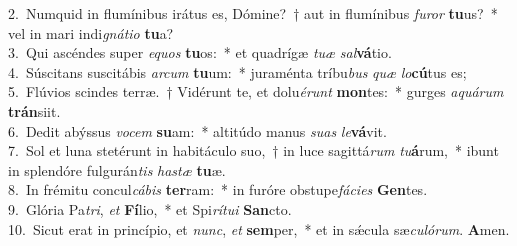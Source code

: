{2.~}Numquid in flumínibus irátus es, Dómine?~† aut in flumínibus \textit{fu}\textit{ror} \textbf{tu}us?~* vel in mari indi\textit{gná}\textit{ti}\textit{o} \textbf{tu}a?\\
{3.~}Qui ascéndes super \textit{e}\textit{quos} \textbf{tu}os:~* et quadrígæ \textit{tu}\textit{æ} \textit{sal}\textbf{vá}tio.\\
{4.~}Súscitans suscitábis \textit{ar}\textit{cum} \textbf{tu}um:~* juraménta tríbu\textit{bus} \textit{quæ} \textit{lo}\textbf{cú}tus es;\\
{5.~}Flúvios scindes terræ.~† Vidérunt te, et dolu\textit{é}\textit{runt} \textbf{mon}tes:~* gurges \textit{a}\textit{quá}\textit{rum} \textbf{trán}siit.\\
{6.~}Dedit abýssus \textit{vo}\textit{cem} \textbf{su}am:~* altitúdo manus \textit{su}\textit{as} \textit{le}\textbf{vá}vit.\\
{7.~}Sol et luna stetérunt in habitáculo suo,~† in luce sagittá\textit{rum} \textit{tu}\textbf{á}rum,~* ibunt in splendóre fulgurán\textit{tis} \textit{ha}\textit{stæ} \textbf{tu}æ.\\
{8.~}In frémitu concul\textit{cá}\textit{bis} \textbf{ter}ram:~* in furóre obstupe\textit{fá}\textit{ci}\textit{es} \textbf{Gen}tes.\\
{9.~}Glória Pa\textit{tri}, \textit{et} \textbf{Fí}lio,~* et Spi\textit{rí}\textit{tu}\textit{i} \textbf{San}cto.\\
{10.~}Sicut erat in princípio, et \textit{nunc}, \textit{et} \textbf{sem}per,~* et in sǽcula sæ\textit{cu}\textit{ló}\textit{rum}. \textbf{A}men.\\

